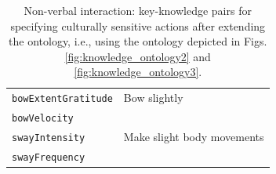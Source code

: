 \documentclass{CSSRforAfrica}
\begin{document}
\begin{table}[H]
\begin{center}
\begin{tabular}{|l l|}
{\footnotesize \verb+bowExtentGratitude+} 	                        & {\footnotesize \verb++  Bow slightly} \vspace{-1.01mm}\\
{\footnotesize \verb+bowVelocity+}                       & {\footnotesize \verb++} \vspace{-1.01mm}\\
{\footnotesize \verb+swayIntensity+} 	                & {\footnotesize \verb++ Make slight body movements} \vspace{-1.01mm}\\
{\footnotesize \verb+swayFrequency+} 	                & {\footnotesize \verb++} \\
\hline \hline
\end{tabular}
\end{center}
\vspace{-6mm}
\caption{Non-verbal interaction: key-knowledge pairs for specifying culturally sensitive actions after extending the ontology, i.e., using the ontology depicted in Figs. \ref{fig:knowledge_ontology2} and \ref{fig:knowledge_ontology3}.}
\label{table:key-knowledge_pairs3}
\end{table}
\clearpage
 
 
\end{document}
